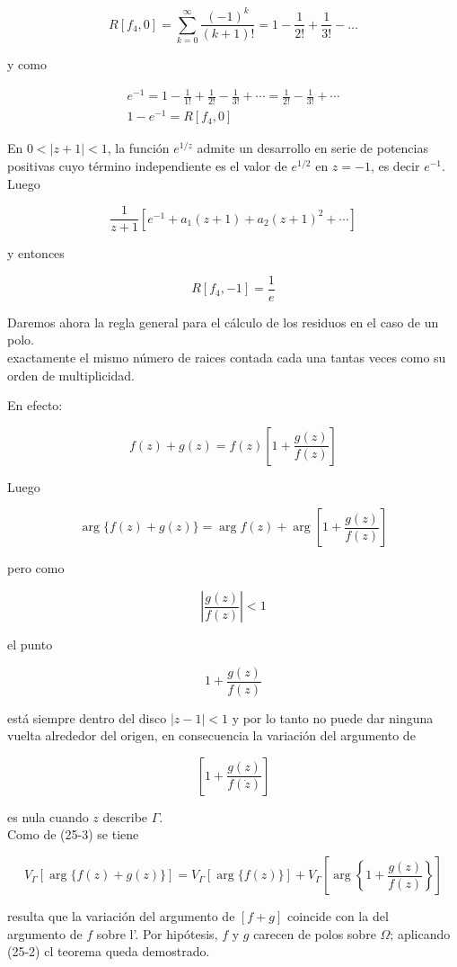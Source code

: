 \documentclass[10pt]{article}
\theoremstyle{plain}
\theoremstyle{definition}
\theoremstyle{remark}
\begin{document}
$$
R\left[f_{4}, 0\right]=\sum_{k=0}^{\infty} \frac{(-1)^{k}}{(k+1)!}=1-\frac{1}{2!}+\frac{1}{3!}-\ldots
$$

y como

$$
\begin{gathered}
e^{-1}=1-\frac{1}{1!}+\frac{1}{2!}-\frac{1}{3!}+\cdots=\frac{1}{2!}-\frac{1}{3!}+\cdots \\
1-e^{-1}=R\left[f_{4}, 0\right]
\end{gathered}
$$

En $0<|z+1|<1$, la función $e^{1 / z}$ admite un desarrollo en serie de potencias positivas cuyo término independiente es el valor de $e^{1 / 2}$ en $z=-1$, es decir $e^{-1}$. Luego

$$
\frac{1}{z+1}\left[e^{-1}+a_{1}(z+1)+a_{2}(z+1)^{2}+\cdots\right]
$$

y entonces

$$
R\left[f_{4},-1\right]=\frac{1}{e}
$$

Daremos ahora la regla general para el cálculo de los residuos en el caso de un polo.\\
exactamente el mismo número de raices contada cada una tantas veces como su orden de multiplicidad.

En efecto:

$$
f(z)+g(z)=f(z)\left[1+\frac{g(z)}{f(z)}\right]
$$

Luego


\begin{equation*}
\arg \{f(z)+g(z)\}=\arg f(z)+\arg \left[1+\frac{g(z)}{f(z)}\right] \tag{25-3}
\end{equation*}


pero como

$$
\left|\frac{g(z)}{f(z)}\right|<1
$$

el punto

$$
1+\frac{g(z)}{f(z)}
$$

está siempre dentro del disco $|z-1|<1$ y por lo tanto no puede dar ninguna vuelta alrededor del origen, en consecuencia la variación del argumento de

$$
\left[1+\frac{g(z)}{f(\dot{z})}\right]
$$

es nula cuando $z$ describe $\Gamma$.\\
Como de (25-3) se tiene

$$
V_{\Gamma}[\arg \{f(z)+g(z)\}]=V_{\Gamma}[\arg \{f(z)\}]+V_{\Gamma}\left[\arg \left\{1+\frac{g(z)}{f(z)}\right\}\right]
$$

resulta que la variación del argumento de $[f+g]$ coincide con la del\\
argumento de $f$ sobre l'. Por hipótesis, $f$ y $g$ carecen de polos sobre $\Omega$; aplicando (25-2) cl teorema queda demostrado.
\end{document}
